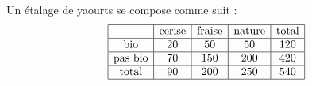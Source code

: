 
\begin{exercice}\label{exosmath-0712}

    Un étalage de yaourts se compose comme suit :
    \begin{equation*}
        \begin{array}[]{|c|c|c|c|c|}
            \hline
            &\text{cerise}&\text{fraise}&\text{nature}&\text{total}\\
            \hline
            \text{bio}&20&50&50&120\\
            \hline
            \text{pas bio}&70&150&200&420\\
            \hline
            \text{total}&90&200&250&540\\
            \hline
        \end{array}
    \end{equation*}

\end{exercice}
